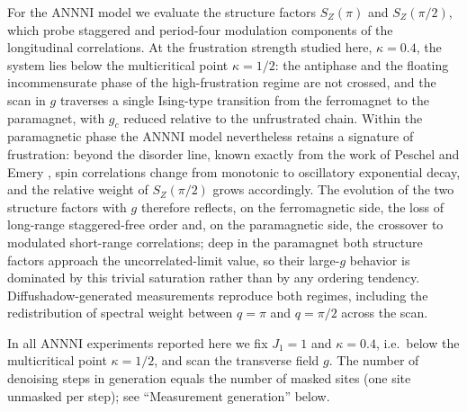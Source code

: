 For the ANNNI model we evaluate the structure factors $S_Z(\pi)$ and
$S_Z(\pi/2)$, which probe staggered and period-four modulation components
of the longitudinal correlations. At the frustration strength studied
here, $\kappa = 0.4$, the system lies below the multicritical point
$\kappa = 1/2$: the antiphase and the floating incommensurate phase of
the high-frustration regime \cite{selke1988annni, beccaria2007floating,
nagy2011exploring} are not crossed, and the scan in $g$ traverses a single
Ising-type transition from the ferromagnet to the paramagnet, with $g_c$
reduced relative to the unfrustrated chain. Within the paramagnetic phase
the ANNNI model nevertheless retains a signature of frustration: beyond
the disorder line, known exactly from the work of Peschel and Emery
\cite{peschel1981calculation}, spin correlations change from monotonic to
oscillatory exponential decay, and the relative weight of $S_Z(\pi/2)$
grows accordingly. The evolution of the two structure factors with $g$
therefore reflects, on the ferromagnetic side, the loss of long-range
staggered-free order and, on the paramagnetic side, the crossover to
modulated short-range correlations; deep in the paramagnet both structure
factors approach the uncorrelated-limit value, so their large-$g$ behavior
is dominated by this trivial saturation rather than by any ordering
tendency. Diffushadow-generated measurements reproduce both regimes,
including the redistribution of spectral weight between $q=\pi$ and
$q=\pi/2$ across the scan.


In all ANNNI experiments reported here we fix $J_1 = 1$ and
$\kappa = 0.4$, i.e.\ below the multicritical point $\kappa = 1/2$, and
scan the transverse field $g$. The number of denoising steps in
generation equals the number of masked sites (one site unmasked per
step); see ``Measurement generation'' below.



